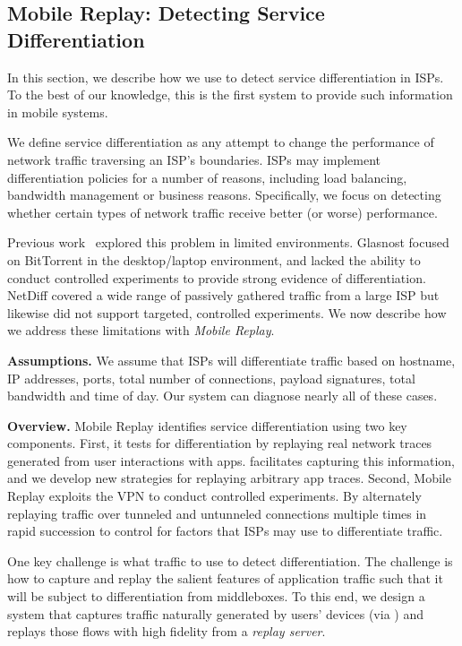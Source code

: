 \subsection{Mobile Replay: Detecting Service Differentiation}

In this section, we describe how we use \meddle to detect service differentiation 
in ISPs. To the best of our knowledge, this is the first system to provide such information 
in mobile systems.

We define service differentiation as any attempt to change the performance 
of network traffic traversing an ISP's boundaries. ISPs may implement differentiation policies 
for a number of reasons, including load balancing, bandwidth management or business reasons. 
Specifically, we focus on detecting whether certain types of network traffic receive 
better (or worse) performance. 

Previous work~\cite{dischinger:glasnost,tariq:nano,zhang:netdiff} explored this problem in limited 
environments. Glasnost focused on BitTorrent in the desktop/laptop environment, 
and lacked the ability to conduct controlled experiments to provide strong evidence 
of differentiation. NetDiff covered a wide range of passively gathered traffic from a 
large ISP but likewise did not support targeted, controlled experiments. We now 
describe how we address these limitations with \emph{Mobile Replay}. 

\noindent\textbf{Assumptions.} We assume that ISPs will differentiate traffic based on hostname, 
IP addresses, ports, total number of connections, payload signatures, total bandwidth and time of day. 
Our system can diagnose nearly all of these cases. 

\noindent\textbf{Overview.} Mobile Replay identifies service differentiation using 
two key components. First, it tests for differentiation by replaying real network traces 
generated from user interactions with apps. \meddle facilitates capturing this information, 
and we develop new strategies for replaying arbitrary app traces. Second, Mobile 
Replay exploits the \meddle VPN to conduct controlled experiments. By alternately replaying 
traffic over tunneled and untunneled connections multiple times in rapid succession to control 
for factors that ISPs may use to differentiate traffic.

One key challenge is what traffic to use to detect differentiation. The challenge is how to capture and replay 
the salient features of application traffic such that it will be subject to differentiation 
from middleboxes. To this end, we design a system that captures 
traffic naturally generated by users' devices (via \meddle) and replays those flows 
with high fidelity from a \emph{replay server}. 

